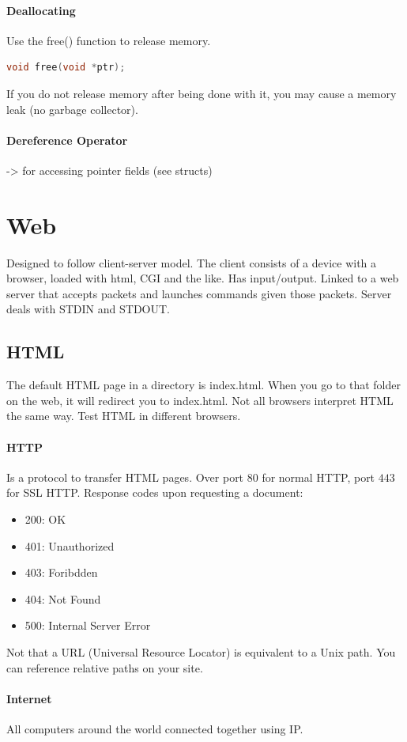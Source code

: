 \documentclass[12 pt]{article}
\begin{document}
\paragraph{Deallocating}
Use the free() function to release memory.
\begin{lstlisting}[language=c]
void free(void *ptr);
\end{lstlisting}
If you do not release memory after being done with it, you may cause a memory leak (no garbage collector).
\paragraph{Dereference Operator}-> for accessing pointer fields (see structs)
\section{Web}Designed to follow client-server model. The client consists of a device with a browser, loaded with html, CGI and the like. Has input/output. Linked to a web server that accepts packets and launches commands given those packets. Server deals with STDIN and STDOUT. 
\subsection{HTML} The default HTML page in a directory is index.html. When you go to that folder on the web, it will redirect you to index.html. Not all browsers interpret HTML the same way. Test HTML in different browsers.
\paragraph{HTTP} Is a protocol to transfer HTML pages. Over port $80$ for normal HTTP, port $443$ for SSL HTTP. Response codes upon requesting a document:
\begin{itemize}
\item 200: OK
\item 401: Unauthorized
\item 403: Foribdden
\item 404: Not Found
\item 500: Internal Server Error
\end{itemize}
Not that a URL (Universal Resource Locator) is equivalent to a Unix path. You can reference relative paths on your site.
\paragraph{Internet} All computers around the world connected together using IP.
\end{document}
